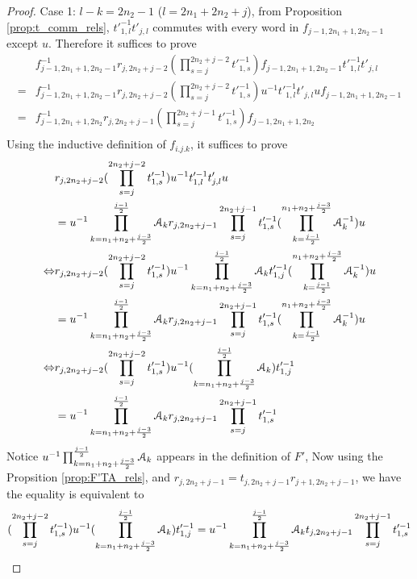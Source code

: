 \documentclass{amsart}
\begin{document}
\begin{proof}
Case 1:
$l-k=2n_2-1$ ($l=2n_1+2n_2+j$), from Proposition \ref{prop:t_comm_rels}, $t'^{-1}_{1,l}
t'_{j,l}$ commutes with every word in $f_{j-1,2n_1+1,2n_2-1}$ except $u$. Therefore it suffices to prove
\[
\begin{aligned}
&f^{-1}_{j-1,2n_1+1,2n_2-1}r_{j,2n_2+j-2}(\prod^{2n_2+j-2}_{s=j} t'^{-1}_{1,s})f_{j-1,2n_1+1,2n_2-1}t'^{-1}_{1,l}
t'_{j,l}\\
=&f^{-1}_{j-1,2n_1+1,2n_2-1}r_{j,2n_2+j-2}(\prod^{2n_2+j-2}_{s=j} t'^{-1}_{1,s})u^{-1}t'^{-1}_{1,l}
t'_{j,l}uf_{j-1,2n_1+1,2n_2-1}\\
=&f^{-1}_{j-1,2n_1+1,2n_2}r_{j,2n_2+j-1}(\prod^{2n_2+j-1}_{s=j} t'^{-1}_{1,s})f_{j-1,2n_1+1,2n_2}\\
\end{aligned}
\]
Using the inductive definition of $f_{i.j.k}$, it suffices to prove
\[
\begin{aligned}
 & r_{j,2n_2+j-2}(\prod^{2n_2+j-2}_{s=j} t'^{-1}_{1,s})u^{-1}t'^{-1}_{1,l}
t'_{j,l}u\\
&=u^{-1}\prod^{\frac{j-1}{2}}_{k=n_1+n_2+\frac{j-3}{2}}\AA_k r_{j,2n_2+j-1}\prod^{2n_2+j-1}_{s=j} t'^{-1}_{1,s}(\prod^{n_1+n_2+\frac{j-3}{2}}_{k=\frac{j-1}{2}}\AA^{-1}_k)u\\
\Leftrightarrow & r_{j,2n_2+j-2}(\prod^{2n_2+j-2}_{s=j} t'^{-1}_{1,s})u^{-1}\prod^{\frac{j-1}{2}}_{k=n_1+n_2+\frac{j-3}{2}}\AA_{k}t'^{-1}_{1,j}(\prod^{n_1+n_2+\frac{j-3}{2}}_{k=\frac{j-1}{2}}\AA^{-1}_{k})u\\
&=u^{-1}\prod^{\frac{j-1}{2}}_{k=n_1+n_2+\frac{j-3}{2}}\AA_k r_{j,2n_2+j-1}\prod^{2n_2+j-1}_{s=j} t'^{-1}_{1,s}(\prod^{n_1+n_2+\frac{j-3}{2}}_{k=\frac{j-1}{2}}\AA^{-1}_k)u\\
\Leftrightarrow & r_{j,2n_2+j-2}(\prod^{2n_2+j-2}_{s=j} t'^{-1}_{1,s})u^{-1}(\prod^{\frac{j-1}{2}}_{k=n_1+n_2+\frac{j-3}{2}}\AA_{k})t'^{-1}_{1,j}\\
&=u^{-1}\prod^{\frac{j-1}{2}}_{k=n_1+n_2+\frac{j-3}{2}}\AA_k r_{j,2n_2+j-1}\prod^{2n_2+j-1}_{s=j} t'^{-1}_{1,s}
\end{aligned}
\]
Notice $u^{-1}\prod^{\frac{j-1}{2}}_{k=n_1+n_2+\frac{j-3}{2}}\AA_k$ appears in the definition of $F'$, Now using the Propsition \ref{prop:F'TA_rels}, and $r_{j,2n_2+j-1}=t_{j,2n_2+j-1}r_{j+1,2n_2+j-1}$, we have the equality is equivalent to
\[
(\prod^{2n_2+j-2}_{s=j} t'^{-1}_{1,s})u^{-1}(\prod^{\frac{j-1}{2}}_{k=n_1+n_2+\frac{j-3}{2}}\AA_{k})t'^{-1}_{1,j}
=u^{-1}\prod^{\frac{j-1}{2}}_{k=n_1+n_2+\frac{j-3}{2}}\AA_k t_{j,2n_2+j-1}\prod^{2n_2+j-1}_{s=j} t'^{-1}_{1,s}
\]


\end{proof}
\end{document}
